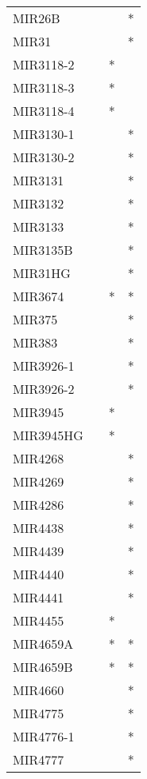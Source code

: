 \begin{longtable}{lccc}
MIR26B         &       &    &       * \\
MIR31          &       &    &       * \\
MIR3118-2      &       &  * &         \\
MIR3118-3      &       &  * &         \\
MIR3118-4      &       &  * &         \\
MIR3130-1      &       &    &       * \\
MIR3130-2      &       &    &       * \\
MIR3131        &       &    &       * \\
MIR3132        &       &    &       * \\
MIR3133        &       &    &       * \\
MIR3135B       &       &    &       * \\
MIR31HG        &       &    &       * \\
MIR3674        &       &  * &       * \\
MIR375         &       &    &       * \\
MIR383         &       &    &       * \\
MIR3926-1      &       &    &       * \\
MIR3926-2      &       &    &       * \\
MIR3945        &       &  * &         \\
MIR3945HG      &       &  * &         \\
MIR4268        &       &    &       * \\
MIR4269        &       &    &       * \\
MIR4286        &       &    &       * \\
MIR4438        &       &    &       * \\
MIR4439        &       &    &       * \\
MIR4440        &       &    &       * \\
MIR4441        &       &    &       * \\
MIR4455        &       &  * &         \\
MIR4659A       &       &  * &       * \\
MIR4659B       &       &  * &       * \\
MIR4660        &       &    &       * \\
MIR4775        &       &    &       * \\
MIR4776-1      &       &    &       * \\
MIR4777        &       &    &       * \\

\end{longtable}
